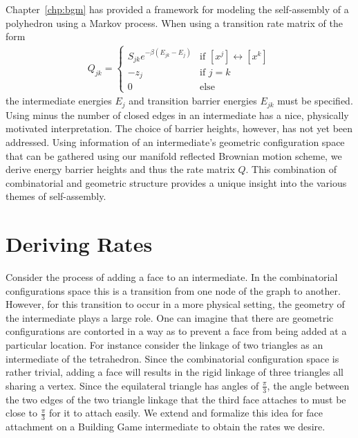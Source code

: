 
Chapter~\ref{chp:bgm} has provided a framework for modeling the self-assembly of a polyhedron using a Markov process. When using a transition rate matrix of the form 
\begin{align}
  \label{eq:Qdef_rep}
  Q_{jk} =
  \begin{cases}
   S_{jk}e^{-\beta\left(E_{jk} - E_{j}\right)} & \text{if } [x^j] \leftrightarrow [x^k]  \\
   -z_j       & \text{if } j = k \\
   0 & \text{else}
  \end{cases}
\end{align}
the intermediate energies $E_j$ and transition barrier energies $E_{jk}$ must be specified. Using minus the number of closed edges in an intermediate has a nice, physically motivated interpretation. The choice of barrier heights, however, has not yet been addressed. Using information of an intermediate's geometric configuration space that can be gathered using our manifold reflected Brownian motion scheme, we derive energy barrier heights and thus the rate matrix $Q$. This combination of combinatorial and geometric structure provides a unique insight into the various themes of self-assembly.

\section{Deriving Rates}

Consider the process of adding a face to an intermediate. In the combinatorial configurations space this is a transition from one node of the graph to another. However, for this transition to occur in a more physical setting, the geometry of the intermediate plays a large role. One can imagine that there are geometric configurations are contorted in a way as to prevent a face from being added at a particular location. For instance consider the linkage of two triangles as an intermediate of the tetrahedron. Since the combinatorial configuration space is rather trivial, adding a face will results in the rigid linkage of three triangles all sharing a vertex. Since the equilateral triangle has angles of $\frac{\pi}{3}$, the angle between the two edges of the two triangle linkage that the third face attaches to must be close to $\frac{\pi}{3}$ for it to attach easily. We extend and formalize this idea for face attachment on a Building Game intermediate to obtain the rates we desire.



